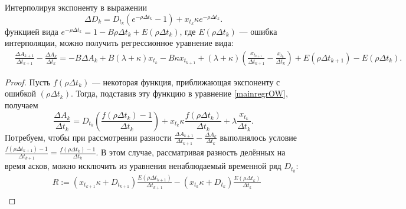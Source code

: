 \begin{appendices}
        \begin{theorem} \label{GenIntT}
                Интерполируя экспоненту в выражении 
                \begin{equation*} \label{DeltaDk}
                        \Delta D_{k} = D_{t_k} (e^{- \rho \Delta t_k} - 1) + x_{t_k} \kappa e^{- \rho \Delta t_k}.
                \end{equation*}
                функцией вида $e^{- \rho \Delta t_k} = 1 - B \rho \Delta t_k + E(\rho \Delta t_k) $, где $E(\rho \Delta t_k)$ ---
                ошибка интерполяции,
                можно получить регрессионное уравнение вида:
                \begin{align*}
                        & \frac{\Delta A_{k+1}}{\Delta t_{k+1}} - \frac{\Delta A_{k}}{\Delta t_{k}} = 
                        -B \Delta A_k + B (\lambda + \kappa) x_{t_k} - B \kappa x_{t_{k+1}} 
                        + (\lambda + \kappa) \left(\frac{x_{t_{k+1}}}{\Delta t_{k+1}} - \frac{x_{t_k}}{\Delta t_{k}}\right) + E (\rho \Delta t_{k+1}) - E (\rho \Delta t_k).
                \end{align*}  
        \end{theorem}
        \begin{proof}
                Пусть $f(\rho \Delta t_k)$ --- некоторая функция, приближающая экспоненту с ошибкой $(\rho \Delta t_k)$.
                Тогда, подставив эту функцию в уравнение \eqref{mainregrOW}, получаем
                \begin{equation*}
                        \frac{\Delta A_k}{\Delta t_k} = D_{t_k} (\frac{f(\rho \Delta t_k) - 1}{\Delta t_k}) 
                        + x_{t_k} \kappa {\frac{f(\rho \Delta t_k)}{\Delta t_k}} + \lambda \frac{x_{t_k}}{\Delta t_k} . 
                \end{equation*}
                Потребуем, чтобы при рассмотрении разности $\frac{\Delta A_{k+1}}{\Delta t_{k+1}} - \frac{\Delta A_k}{\Delta t_k}$ 
                выполнялось условие 
                $\frac{f(\rho \Delta t_{k+1}) - 1}{\Delta t_{k+1}} = \frac{f(\rho \Delta t_k) - 1}{\Delta t_k}$. В этом случае, 
                рассматривая разность делённых на время асков, можно
                исключить из уравнения ненаблюдаемый временной ряд $D_{t_k}$:
                \begin{align*}
                        & R := (x_{t_{k+1}} \kappa + D_{t_{k+1}}) \frac{E(\rho \Delta t_{k+1})}{\Delta t_{k+1}} -
                         (x_{t_k} \kappa + D_{t_k}) \frac{E(\rho \Delta t_k)}{\Delta t_k} \\

\end{align*}
\end{proof}
\end{appendices}
